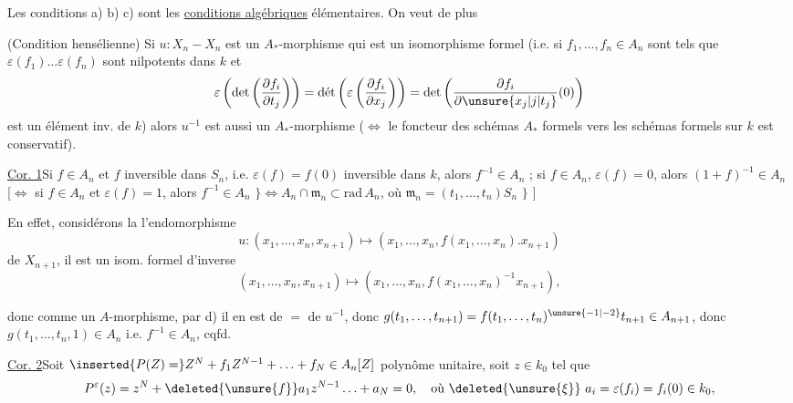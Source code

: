 Les conditions a) b) c) sont les \uline{conditions algébriques} élémentaires. On veut de plus


 (Condition hensélienne) Si $u:X_n-X_n$ est un $A_*$-morphisme qui est un isomorphisme formel (i.e. si $f_1,\ldots,f_n\in A_n$ sont tels que $\varepsilon(f_1)\ldots\varepsilon(f_n)$ sont nilpotents dans $k$ et
\[
 \varepsilon\left(\det\left(\frac{\partial f_i}{\partial t_j}\right)\right)
 =\text{dét}\left(\varepsilon\left(\frac{\partial f_i}{\partial x_j}\right)\right)
 =\det\left(\frac{\partial f_i}{\partial\unsure{x_j|j|t_j}}(0)\right)
\]
est un élément inv. de $k$) alors $u^{-1}$ est aussi un $A_*$-morphisme ($\Leftrightarrow$ le foncteur des schémas $A_*$ formels vers les schémas formels sur $k$ est conservatif).

\uline{Cor. 1}\qquad Si $f\in A_n$ et $f$ inversible dans $S_n$, i.e. $\varepsilon(f)=f(0)$ inversible dans $k$, alors $f^{-1}\in A_n$ ; \inserted{$\Longleftrightarrow$}  si $f\in A_n$, $\varepsilon(f)=0$, alors $(1+f)^{-1}\in A_n$ [$\Longleftrightarrow$ si $f\in A_n$ et $\varepsilon(f)=1$, alors $f^{-1}\in A_n$ $\}\Longleftrightarrow A_n\cap\mathfrak m_n\subset\mathrm{rad}\,A_n$, où  $\mathfrak m_n=(t_1,\ldots,t_n)S_n$ $\}$ ]


En effet, considérons la  l'endomorphisme
\[
 u:(x_1,\ldots,x_n,x_{n+1})\mapsto(x_1,\ldots,x_n,f(x_1,\ldots,x_n).x_{n+1})
\]
de $X_{n+1}$, il est un isom. formel d'inverse
\[
 (x_1,\ldots,x_n,x_{n+1})\mapsto(x_1,\ldots,x_n,f(x_1,\ldots,x_n)^{-1}x_{n+1}),
\]

donc comme  un $A$-morphisme, par d) il en est de $=$ de $u^{-1}$, donc $g(t_1,\ldots,t_{n+1})=f(t_1,\ldots,t_n)^{\unsure{-1|-2}}t_{n+1}\in A_{n+1}$,  donc $g(t_1,\ldots,t_n,1)\in A_n$ i.e. $f^{-1}\in A_n$, cqfd.



\uline{Cor. 2}\qquad Soit $\inserted{P(Z)=}Z^N+f_1 Z^{N-1}+\ldots+f_N\in A_n[Z]$ polynôme unitaire, soit $z\in k_0$ tel que
\[
 P^\varepsilon(z)=z^N+\deleted{\unsure{f}}a_1 z^{N-1}\ldots+a_N=0,\quad
 \text{où }\deleted{\unsure{\xi}}\ a_i=\varepsilon(f_i)=f_i(0)\in k_0,
\]
